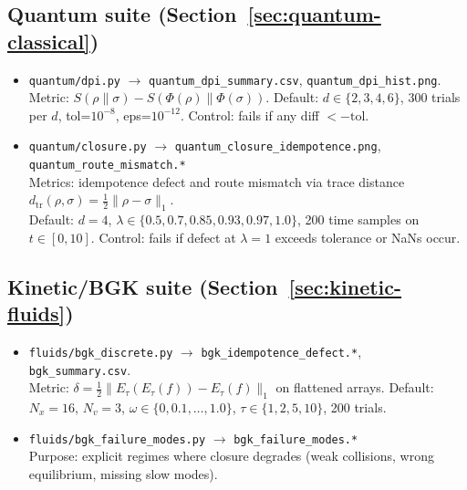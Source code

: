 \documentclass[11pt]{article}
\begin{document}
\subsection*{Quantum suite (Section~\ref{sec:quantum-classical})}
\begin{itemize}
  \item {\small\texttt{quantum/dpi.py}} $\to$ {\small\texttt{quantum\_dpi\_summary.csv}}, {\small\texttt{quantum\_dpi\_hist.png}}.\\
  Metric: $S(\rho\|\sigma)-S(\Phi(\rho)\|\Phi(\sigma))$.
  Default: $d\in\{2,3,4,6\}$, 300 trials per $d$, tol=$10^{-8}$, eps=$10^{-12}$.
  Control: fails if any diff $<-\mathrm{tol}$.

  \item {\small\texttt{quantum/closure.py}} $\to$ {\small\texttt{quantum\_closure\_idempotence.png}},\\
  {\small\texttt{quantum\_route\_mismatch.*}}\\
  Metrics: idempotence defect and route mismatch via trace distance $d_{\mathrm{tr}}(\rho,\sigma)=\tfrac12\|\rho-\sigma\|_1$.\\
  Default: $d=4$, $\lambda\in\{0.5,0.7,0.85,0.93,0.97,1.0\}$, 200 time samples on $t\in[0,10]$.
  Control: fails if defect at $\lambda=1$ exceeds tolerance or NaNs occur.
\end{itemize}

\subsection*{Kinetic/BGK suite (Section~\ref{sec:kinetic-fluids})}
\begin{itemize}
  \item {\small\texttt{fluids/bgk\_discrete.py}} $\to$ {\small\texttt{bgk\_idempotence\_defect.*}},\\
  {\small\texttt{bgk\_summary.csv}}.\\
  Metric: $\delta=\tfrac12\|E_\tau(E_\tau(f))-E_\tau(f)\|_1$ on flattened arrays.
  Default: $N_x=16$, $N_v=3$, $\omega\in\{0,0.1,\dots,1.0\}$, $\tau\in\{1,2,5,10\}$, 200 trials.

  \item {\small\texttt{fluids/bgk\_failure\_modes.py}} $\to$ {\small\texttt{bgk\_failure\_modes.*}}\\
  Purpose: explicit regimes where closure degrades (weak collisions, wrong equilibrium, missing slow modes).
\end{itemize}
\end{document}
